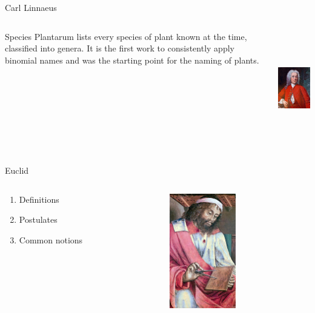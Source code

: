 \documentclass[10pt]{beamer}
\begin{document}
\begin{frame}{Carl Linnaeus}
    \begin{columns}
        \begin{column}{0.6\textwidth}
			Species Plantarum lists every species of plant known at the time, classified into genera. It is the first work to consistently apply binomial names and was the starting point for the naming of plants.
        \end{column}
        \begin{column}{0.4\textwidth}  %
                \begin{center}
					\includegraphics[height=5cm]{images/LinnaeusWeddingPortrait.jpg}
                \end{center}
        \end{column}
    \end{columns}
\end{frame}

\begin{frame}{Euclid}
	\begin{columns}
        \begin{column}{0.6\textwidth}
			\begin{enumerate}
				\item Definitions
				\item Postulates
				\item Common notions
			\end{enumerate}
		\end{column}
        \begin{column}{0.4\textwidth}  %
                \begin{center}
					\includegraphics[height=5cm]{images/euclid.jpg}
                \end{center}
        \end{column}
	\end{columns}
\end{frame}
\end{document}
